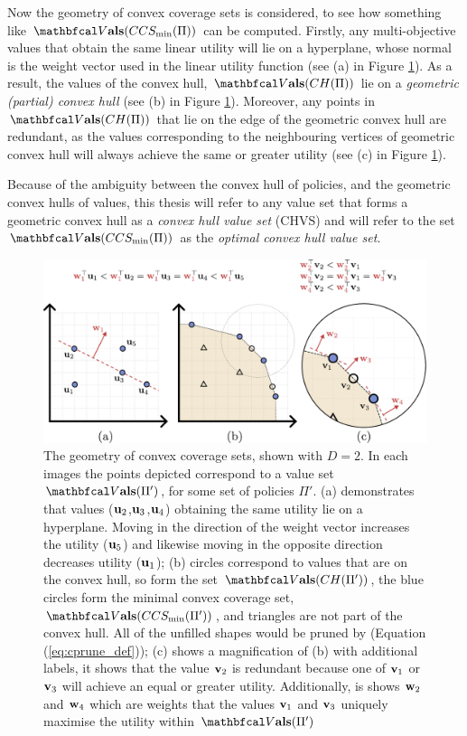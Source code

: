     Now the geometry of convex coverage sets is considered, to see how something like $\valset(CCS_{\min}(\Pi))$ can be computed. Firstly, any multi-objective values that obtain the same linear utility will lie on a hyperplane, whose normal is the weight vector used in the linear utility function (see (a) in Figure \ref{fig:convex_hull_geometry}). As a result, the values of the convex hull, $\valset(CH(\Pi))$ lie on a \textit{geometric (partial) convex hull} (see (b) in Figure \ref{fig:convex_hull_geometry}). Moreover, any points in $\valset(CH(\Pi))$ that lie on the edge of the geometric convex hull are redundant, as the values corresponding to the neighbouring vertices of geometric convex hull will always achieve the same or greater utility (see (c) in Figure \ref{fig:convex_hull_geometry}).

    Because of the ambiguity between the convex hull of policies, and the geometric convex hulls of values, this thesis will refer to any value set that forms a geometric convex hull as a \textit{convex hull value set} (CHVS) and will refer to the set $\valset(CCS_{\min}(\Pi))$ as the \textit{optimal convex hull value set}.

    \begin{figure}
        \centering\includegraphics[width=1.0\textwidth]{figures/ch2/ch_geometry.pdf} 
        \caption{The geometry of convex coverage sets, shown with $D=2$. In each images the points depicted correspond to a value set $\valset(\Pi')$, for some set of policies $\Pi'$. (a) demonstrates that values ($\mathbf{u}_2$,$\mathbf{u}_3$,$\mathbf{u}_4$) obtaining the same utility lie on a hyperplane. Moving in the direction of the weight vector increases the utility ($\mathbf{u}_5$) and likewise moving in the opposite direction decreases utility ($\mathbf{u}_1$); (b) circles correspond to values that are on the convex hull, so form the set $\valset(CH(\Pi'))$, the blue circles form the minimal convex coverage set, $\valset(CCS_{\min}(\Pi'))$, and triangles are not part of the convex hull. All of the unfilled shapes would be pruned by \cprune (Equation (\ref{eq:cprune_def})); (c) shows a magnification of (b) with additional labels, it shows that the value $\mathbf{v}_2$ is redundant because one of $\mathbf{v}_1$ or $\mathbf{v}_3$ will achieve an equal or greater utility. Additionally, is shows $\mathbf{w}_2$ and $\mathbf{w}_4$ which are weights that the values $\mathbf{v}_1$ and $\mathbf{v}_3$ uniquely maximise the utility within $\valset(\Pi')$}
        \label{fig:convex_hull_geometry} 
    \end{figure}

